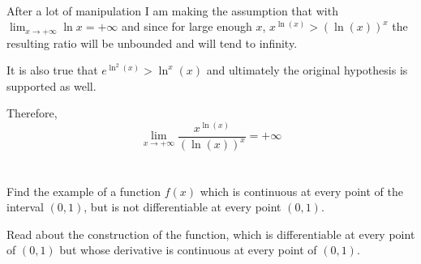 \documentclass[]{article}
\begin{document}
\begin{align*}
\end{align*}

After a lot of manipulation I am making the assumption that with
$\lim_{x \to + \infty} \ln{x} = + \infty$
and since for large enough $x$, 
$x^{\ln(x)} > (\ln(x))^x$
the resulting ratio will be unbounded and will tend to infinity.

It is also true that
$e^{\ln^2(x)} > \ln^x(x)$
and ultimately the original hypothesis is supported as well.

Therefore, 
\[
    \lim_{x \to + \infty} \frac{x^{\ln(x)}}{(\ln(x))^x} = + \infty
\]

\newpage
\section{}
Find the example of a function $f(x)$ which is continuous at every point of the interval $(0,1)$, but is not differentiable at every point $(0,1)$.

Read about the construction of the function, which is differentiable at every point of $(0,1)$ but whose derivative is continuous at every point of $(0,1)$.
\end{document}
